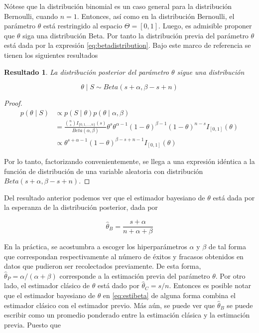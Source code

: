 \documentclass[
  12pt,
  spanish,
]{book}
\newtheorem{proposition}{Resultado}[chapter]
\theoremstyle{definition}
\theoremstyle{definition}
\theoremstyle{definition}
\theoremstyle{definition}
\theoremstyle{remark}
\begin{document}
Nótese que la distribución binomial es un caso general para la
distribución Bernoulli, cuando \(n=1\). Entonces, así como en la
distribución Bernoulli, el parámetro \(\theta\) está restringido al
espacio \(\Theta=[0,1]\). Luego, es admisible proponer que \(\theta\) siga
una distribución Beta. Por tanto la distribución previa del parámetro
\(\theta\) está dada por la expresión \eqref{eq:betadistribution}. Bajo
este marco de referencia se tienen los siguientes resultados

\begin{proposition}
\protect\hypertarget{prp:unnamed-chunk-11}{}{\label{prp:unnamed-chunk-11} }La distribución posterior del parámetro \(\theta\) sigue una distribución

\begin{equation*}
\theta \mid S \sim Beta(s+\alpha,\beta-s+n)
\end{equation*}
\end{proposition}

\begin{proof}
\iffalse{} {Prueba. } \fi{}\begin{align*}
p(\theta \mid S)&\propto p(S \mid \theta)p(\theta \mid \alpha,\beta)\\
&=\frac{\binom{n}{s}I_{\{0,1,\ldots,n\}}(s)}{Beta(\alpha,\beta)}
\theta^s\theta^{\alpha-1} (1-\theta)^{\beta-1}(1-\theta)^{n-s}I_{[0,1]}(\theta)\\
&\propto \theta^{s+\alpha-1} (1-\theta)^{\beta-s+n-1}I_{[0,1]}(\theta)
\end{align*}

Por lo tanto, factorizando convenientemente, se llega a una expresión idéntica a la función de distribución de una variable aleatoria con distribución \(Beta(s+\alpha,\beta-s+n)\).
\end{proof}

Del resultado anterior podemos ver que el estimador bayesiano de
\(\theta\) está dada por la esperanza de la distribución posterior, dada
por

\begin{equation}
\label{eq:estibeta}
\hat{\theta}_{B}=\frac{s+\alpha}{n+\alpha+\beta}
\end{equation}

En la práctica, se acostumbra a escoger los hiperparámetros \(\alpha\) y
\(\beta\) de tal forma que correspondan respectivamente al número de
éxitos y fracasos obtenidos en datos que pudieron ser recolectados
previamente. De esta forma, \(\hat{\theta}_{P}=\alpha/(\alpha+\beta)\)
corresponde a la estimación previa del parámetro \(\theta\). Por otro
lado, el estimador clásico de \(\theta\) está dado por
\(\hat{\theta}_{C}=s/n\). Entonces es posible notar que el estimador
bayesiano de \(\theta\) en \eqref{eq:estibeta} de alguna forma combina el
estimador clásico con el estimador previo. Más aún, se puede ver que
\(\hat{\theta}_{B}\) se puede escribir como un promedio ponderado entre la
estimación clásica y la estimación previa. Puesto que
\end{document}
